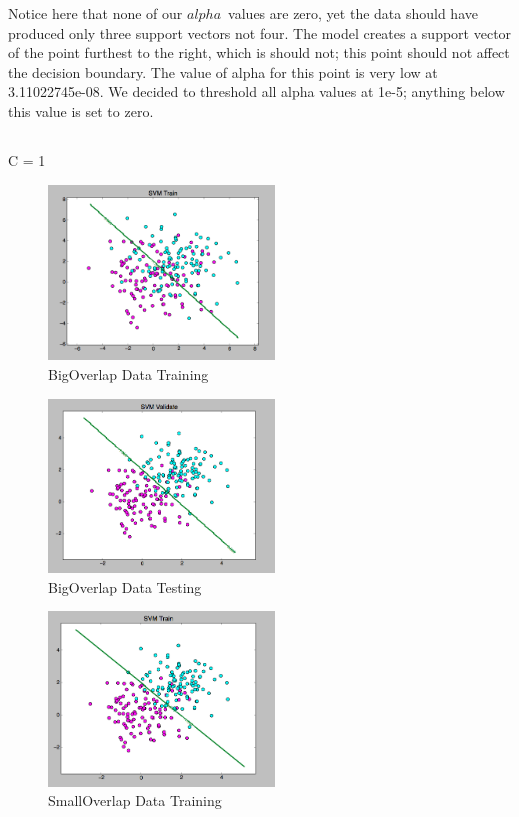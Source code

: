 \documentclass[pageno]{jpaper}
\begin{document}
Notice here that none of our $alpha$\ values are zero, yet the data should have produced only three support vectors not four. The model creates a support vector of the point furthest to the right, which is should not; this point should not affect the decision boundary. The value of alpha for this point is very low at 3.11022745e-08. We decided to threshold all alpha values at 1e-5; anything below this value is set to zero.

\subsection{}
C = 1 \\
\begin{figure}[ht!]
\centering
\includegraphics[width=60mm]{bigOverlap_train}
\caption{BigOverlap Data Training}
\label{overflow}
\end{figure}

\begin{figure}[ht!]
\centering
\includegraphics[width=60mm]{bigOverlap_test}
\caption{BigOverlap Data Testing}
\label{overflow}
\end{figure}

\begin{figure}[ht!]
\centering
\includegraphics[width=60mm]{smallOverlap_train}
\caption{SmallOverlap Data Training}
\label{overflow}
\end{figure}
\end{document}
